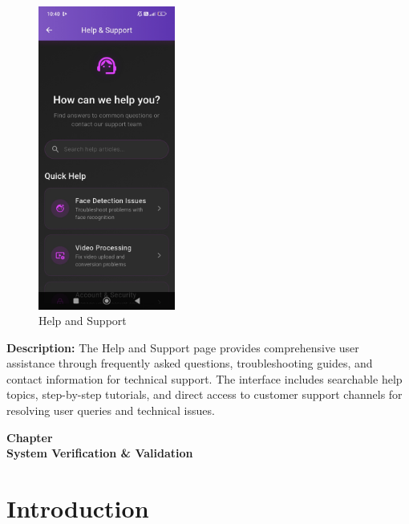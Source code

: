 \documentclass[12pt,a4paper]{report}
\begin{document}
\begin{figure}[H]
\centering
\includegraphics[width=0.4\textwidth]{figures/help.png}
\caption{Help and Support}
\label{fig:help and support}
\end{figure}

\textbf{Description:} The Help and Support page provides comprehensive user assistance through frequently asked questions, troubleshooting guides, and contact information for technical support. The interface includes searchable help topics, step-by-step tutorials, and direct access to customer support channels for resolving user queries and technical issues.

\newpage
\clearpage
\thispagestyle{empty}  %
\vspace*{\fill}
\begin{center}
{\Huge\bfseries Chapter \thechapter}\\[30pt]
{\Huge\bfseries System Verification \& Validation}
\end{center}
\vspace*{\fill}
\label{ch:verification}
\clearpage
\newpage

\section{Introduction}
\end{document}
